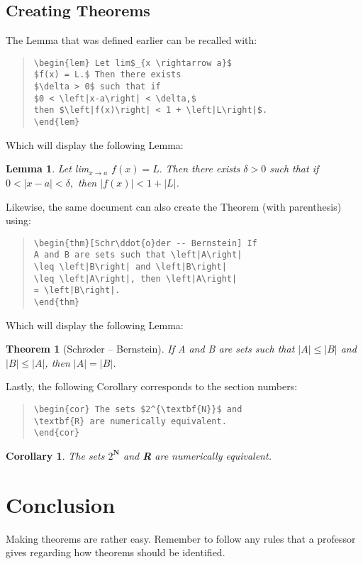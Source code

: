 \documentclass{article}
\newtheorem{lem}{Lemma}
\newtheorem{thm}{Theorem}
\newtheorem{cor}{Corollary}[section]
\begin{document}
\subsection{Creating Theorems}

The Lemma that was defined earlier can be recalled with:
\begin{quote}
\begin{verbatim}
\begin{lem} Let lim$_{x \rightarrow a}$ 
$f(x) = L.$ Then there exists 
$\delta > 0$ such that if 
$0 < \left|x-a\right| < \delta,$ 
then $\left|f(x)\right| < 1 + \left|L\right|$.
\end{lem}
\end{verbatim}
\end{quote}
\smallskip
Which will display the following Lemma:
\begin{lem} Let lim$_{x \rightarrow a}$ 
$f(x) = L.$ Then there exists 
$\delta > 0$ such that if 
$0 < \left|x-a\right| < \delta,$ 
then $\left|f(x)\right| < 1 + \left|L\right|$.
\end{lem}
\smallskip
Likewise, the same document can also create the Theorem (with parenthesis) using:
\begin{quote}
\begin{verbatim}
\begin{thm}[Schr\ddot{o}der -- Bernstein] If
A and B are sets such that \left|A\right|
\leq \left|B\right| and \left|B\right|
\leq \left|A\right|, then \left|A\right|
= \left|B\right|.
\end{thm}
\end{verbatim}
\end{quote}
\smallskip
Which will display the following Lemma:
\begin{thm}[Schr$\ddot{o}$der -- Bernstein] If A and B are sets such that $\left|A\right| \leq \left|B\right|$ and $\left|B\right| \leq \left|A\right|$, then $\left|A\right| = \left|B\right|$.
\end{thm}
\smallskip
Lastly, the following Corollary corresponds to the section numbers:
\begin{quote}
\begin{verbatim}
\begin{cor} The sets $2^{\textbf{N}}$ and
\textbf{R} are numerically equivalent.
\end{cor}
\end{verbatim}
\end{quote}
\smallskip
\begin{cor} The sets $2^{\textbf{N}}$ and \textbf{R} are numerically equivalent.
\end{cor}

\section{Conclusion}

Making theorems are rather easy. Remember to follow any rules that a professor gives regarding how theorems should be identified.
\end{document}
